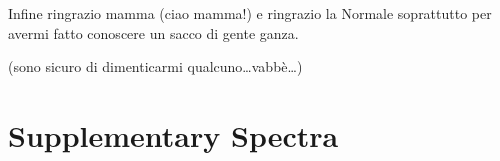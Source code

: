 \documentclass[a4paper,12pt,openright]{book}
\begin{document}
Infine ringrazio mamma (ciao mamma!) e ringrazio la Normale soprattutto per avermi fatto conoscere un sacco di gente ganza.

(sono sicuro di dimenticarmi qualcuno\ldots vabbè\ldots)

\appendix \chapter{Supplementary Spectra}
\graphicspath{ {./img/spectra/} }

\renewcommand{\bottomfraction}{0.99} %
\setcounter{bottomnumber}{3} %


\end{document}
